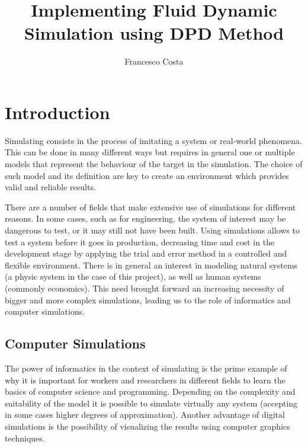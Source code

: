 \documentclass[]{usiinfbachelorproject}
\author{Francesco Costa}
\title{Implementing Fluid Dynamic Simulation using DPD Method}
\subtitle{}
\begin{document}
\maketitle

\tableofcontents

\newpage

\section{Introduction} \label{introduction}

Simulating consists in the process of imitating a system or real-world
phenomena. This can be done in many different ways but requires in general 
one or multiple models that represent the behaviour of the target in the 
simulation. The choice of such model and its definition are key to create 
an environment which provides valid and reliable results.

There are a number of fields that make extensive use of simulations for 
different reasons. In some cases, such as for engineering, the system of 
interest may be dangerous to test, or it may still not have been built. 
Using simulations allows to test a system before it goes in production, 
decreasing time and cost in the development stage by applying the trial 
and error method in a controlled and flexible environment. There is in general 
an interest in modeling natural systems (a physic system in the case of this project), as well as 
human systems (commonly economics). This need brought forward an increasing necessity of 
bigger and more complex simulations, leading us to the role of informatics and computer simulations.

\subsection{Computer Simulations}
The power of informatics in the context of simulating is the prime example of 
why it is important for workers and researchers in different fields to learn 
the basics of computer science and programming. Depending on the complexity and 
suitability of the model it is possible to simulate virtually any system (accepting 
in some cases higher degrees of approximation). Another advantage of digital simulations 
is the possibility of visualizing the results using computer graphics techniques.
\end{document}
